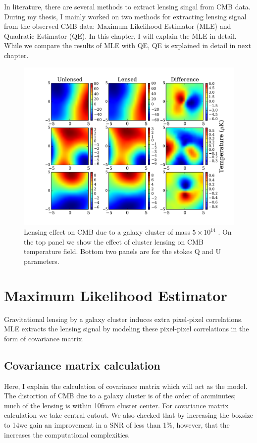 In literature, there are several methods to extract lensing singal from CMB data. 
During my thesis, I mainly worked on two methods for extracting lensing signal from the observed CMB data: Maximum Likelihood Estimator (MLE) and Quadratic Estimator (QE). 
In this chapter, I will explain the MLE in detail. While we compare the results of MLE with QE, QE is explained in detail in next chapter.
\begin{figure}
\includegraphics[width=\linewidth, keepaspectratio]{figs/lensing_signal.pdf}
 \caption{Lensing effect on CMB due to a galaxy cluster of mass $5\times 10^{14}$ \msolar.
  On the top panel we show the effect of cluster lensing on CMB temperature field.
  Bottom two panels are for the stokes Q and U parameters. 
 } 
\label{fig:lensing_signal}
\end{figure}

\section{Maximum Likelihood Estimator}
Gravitational lensing by a galaxy cluster induces extra pixel-pixel correlations. 
MLE extracts the lensing signal by modeling these pixel-pixel correlations in the form of covariance matrix.


\subsection{Covariance matrix calculation}
Here, I explain the calculation of covariance matrix which will act as the model.
The distortion of CMB due to a galaxy cluster is of the order of arcminutes; much of the lensing is within 10\am from cluster center.
For covariance matrix calculation we take central \smallboxsize cutout.
We also checked that by increasing the boxsize to 14\am we gain an improvement in a SNR of less than 1\%, however, that the increases the computational complexities. 


